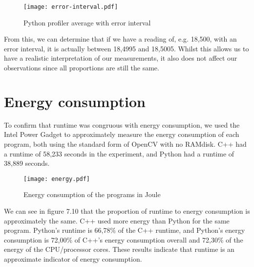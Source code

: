 \begin{figure}[H]
	\centering
	\texttt{[image: error-interval.pdf]}
	\caption{Python profiler average with error interval}
	\label{figure:error-interval}
\end{figure}

From this, we can determine that if we have a reading of, e.g. 18,500, with an error interval, it is actually between 18,4995 and 18,5005. Whilst this allows us to have a realistic interpretation of our measurements, it also does not affect our observations since all proportions are still the same.

\section{Energy consumption}
To confirm that runtime was congruous with energy consumption, we used the Intel Power Gadget to approximately measure the energy consumption of each program, both using the standard form of OpenCV with no RAMdisk. C++ had a runtime of 58,233 seconds in the experiment, and Python had a runtime of 38,889 seconds.

\begin{figure}[H]
	\centering
	\texttt{[image: energy.pdf]}
	\caption{Energy consumption of the programs in Joule}
	\label{figure:energy-consumption}
\end{figure}

We can see in figure 7.10 that the proportion of runtime to energy consumption is approximately the same. C++ used more energy than Python for the same program. Python’s runtime is 66,78\% of the C++ runtime, and Python’s energy consumption is 72,00\% of C++’s energy consumption overall and 72,30\% of the energy of the CPU/processor cores. These results indicate that runtime is an approximate indicator of energy consumption.

